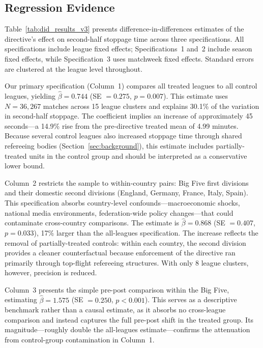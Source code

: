 \subsection{Regression Evidence}
\label{subsec:regression}

Table~\ref{tab:did_results_v3} presents difference-in-differences estimates of the directive's effect on second-half stoppage time across three specifications. All specifications include league fixed effects; Specifications~1 and~2 include season fixed effects, while Specification~3 uses matchweek fixed effects. Standard errors are clustered at the league level throughout.



Our primary specification (Column~1) compares all treated leagues to all control leagues, yielding $\hat{\beta} = 0.744$ (SE $= 0.275$, $p = 0.007$). This estimate uses $N = 36{,}267$ matches across 15 league clusters and explains 30.1\% of the variation in second-half stoppage. The coefficient implies an increase of approximately 45 seconds---a 14.9\% rise from the pre-directive treated mean of 4.99 minutes. Because several control leagues also increased stoppage time through shared refereeing bodies (Section~\ref{sec:background}), this estimate includes partially-treated units in the control group and should be interpreted as a conservative lower bound.

Column~2 restricts the sample to within-country pairs: Big Five first divisions and their domestic second divisions (England, Germany, France, Italy, Spain). This specification absorbs country-level confounds---macroeconomic shocks, national media environments, federation-wide policy changes---that could contaminate cross-country comparisons. The estimate is $\hat{\beta} = 0.868$ (SE $= 0.407$, $p = 0.033$), 17\% larger than the all-leagues specification. The increase reflects the removal of partially-treated controls: within each country, the second division provides a cleaner counterfactual because enforcement of the directive ran primarily through top-flight refereeing structures. With only 8 league clusters, however, precision is reduced.

Column~3 presents the simple pre-post comparison within the Big Five, estimating $\hat{\beta} = 1.575$ (SE $= 0.250$, $p < 0.001$). This serves as a descriptive benchmark rather than a causal estimate, as it absorbs no cross-league comparison and instead captures the full pre-post shift in the treated group. Its magnitude---roughly double the all-leagues estimate---confirms the attenuation from control-group contamination in Column~1.

